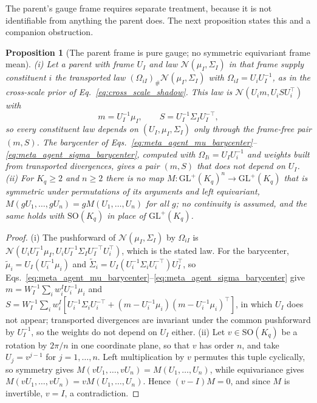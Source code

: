 \documentclass[11pt]{article}
\newtheorem{proposition}{Proposition}
\begin{document}
The parent's gauge frame requires separate treatment, because it is not identifiable from anything the parent does. The next proposition states this and a companion obstruction.

\begin{proposition}[The parent frame is pure gauge; no symmetric equivariant frame mean]
\label{prop:parent_frame_gauge}
(i) Let a parent with frame $U_I$ and law $\mathcal{N}(\mu_I, \Sigma_I)$ in that frame supply constituent $i$ the transported law $(\Omega_{iI})_\#\mathcal{N}(\mu_I, \Sigma_I)$ with $\Omega_{iI} = U_i U_I^{-1}$, as in the cross-scale prior of Eq.~\eqref{eq:cross_scale_shadow}. This law is $\mathcal{N}(U_i m, U_i S U_i^\top)$ with
\begin{equation*}
m = U_I^{-1}\mu_I, \qquad S = U_I^{-1}\Sigma_I U_I^{-\top},
\end{equation*}
so every constituent law depends on $(U_I, \mu_I, \Sigma_I)$ only through the frame-free pair $(m, S)$. The barycenter of Eqs.~\eqref{eq:meta_agent_mu_barycenter}--\eqref{eq:meta_agent_sigma_barycenter}, computed with $\Omega_{Ii} = U_I U_i^{-1}$ and weights built from transported divergences, gives a pair $(m, S)$ that does not depend on $U_I$.
(ii) For $K_q \ge 2$ and $n \ge 2$ there is no map $M: \mathrm{GL}^+(K_q)^n \to \mathrm{GL}^+(K_q)$ that is symmetric under permutations of its arguments and left equivariant, $M(gU_1, \ldots, gU_n) = g M(U_1, \ldots, U_n)$ for all $g$; no continuity is assumed, and the same holds with $\mathrm{SO}(K_q)$ in place of $\mathrm{GL}^+(K_q)$.
\end{proposition}

\begin{proof}
(i) The pushforward of $\mathcal{N}(\mu_I, \Sigma_I)$ by $\Omega_{iI}$ is $\mathcal{N}(U_i U_I^{-1}\mu_I, U_i U_I^{-1}\Sigma_I U_I^{-\top} U_i^\top)$, which is the stated law. For the barycenter, $\tilde{\mu}_i = U_I (U_i^{-1}\mu_i)$ and $\tilde{\Sigma}_i = U_I (U_i^{-1}\Sigma_i U_i^{-\top}) U_I^\top$, so Eqs.~\eqref{eq:meta_agent_mu_barycenter}--\eqref{eq:meta_agent_sigma_barycenter} give $m = W_I^{-1}\sum_i w_i^I U_i^{-1}\mu_i$ and $S = W_I^{-1}\sum_i w_i^I [U_i^{-1}\Sigma_i U_i^{-\top} + (m - U_i^{-1}\mu_i)(m - U_i^{-1}\mu_i)^\top]$, in which $U_I$ does not appear; transported divergences are invariant under the common pushforward by $U_I^{-1}$, so the weights do not depend on $U_I$ either. (ii) Let $v \in \mathrm{SO}(K_q)$ be a rotation by $2\pi/n$ in one coordinate plane, so that $v$ has order $n$, and take $U_j = v^{j-1}$ for $j = 1, \ldots, n$. Left multiplication by $v$ permutes this tuple cyclically, so symmetry gives $M(vU_1, \ldots, vU_n) = M(U_1, \ldots, U_n)$, while equivariance gives $M(vU_1, \ldots, vU_n) = vM(U_1, \ldots, U_n)$. Hence $(v - I)M = 0$, and since $M$ is invertible, $v = I$, a contradiction.
\end{proof}
\end{document}
